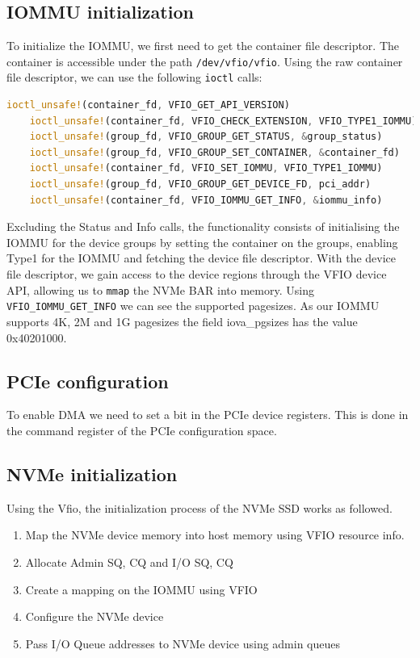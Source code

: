 \subsection{IOMMU initialization}\label{sec:iommuinit}
To initialize the IOMMU, we first need to get the container file descriptor. The container is accessible under the path \texttt{/dev/vfio/vfio}. Using the raw container file descriptor, we can use the following \texttt{ioctl} calls:

\begin{lstlisting}[language=Rust, caption={\texttt{ioctl} calls needed for IOMMU initialization}, label=lst:containerioctls]
    ioctl_unsafe!(container_fd, VFIO_GET_API_VERSION)
    ioctl_unsafe!(container_fd, VFIO_CHECK_EXTENSION, VFIO_TYPE1_IOMMU)
    ioctl_unsafe!(group_fd, VFIO_GROUP_GET_STATUS, &group_status)
    ioctl_unsafe!(group_fd, VFIO_GROUP_SET_CONTAINER, &container_fd)
    ioctl_unsafe!(container_fd, VFIO_SET_IOMMU, VFIO_TYPE1_IOMMU)
    ioctl_unsafe!(group_fd, VFIO_GROUP_GET_DEVICE_FD, pci_addr)
    ioctl_unsafe!(container_fd, VFIO_IOMMU_GET_INFO, &iommu_info)   
\end{lstlisting}

Excluding the Status and Info calls, the functionality consists of initialising the IOMMU for the device groups by setting the container on the groups, enabling Type1 for the IOMMU and fetching the device file descriptor. With the device file descriptor, we gain access to the device regions through the VFIO device API, allowing us to \texttt{mmap} the NVMe BAR into memory. Using \texttt{VFIO\_IOMMU\_GET\_INFO} we can see the supported pagesizes. As our IOMMU supports 4K, 2M and 1G pagesizes the field iova\_pgsizes has the value 0x40201000.

\subsection{PCIe configuration}\label{sec:pcieconfig}
To enable DMA we need to set a bit in the PCIe device registers. %
This is done in the command register of the PCIe configuration space.


\subsection{NVMe initialization}\label{sec:nvmeinit}
Using the Vfio, the initialization process of the NVMe SSD works as followed.

\begin{enumerate}
    \item Map the NVMe device memory into host memory using VFIO resource info.
    \item Allocate Admin SQ, CQ and I/O SQ, CQ
    \item Create a mapping on the IOMMU using VFIO
    \item Configure the NVMe device
    \item Pass I/O Queue addresses to NVMe device using admin queues
\end{enumerate}

